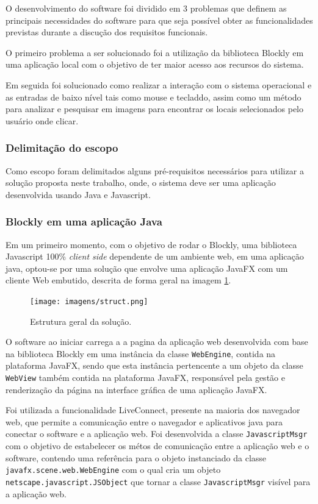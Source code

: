 \documentclass[tg]{mdtufsm}
\begin{document}
    O desenvolvimento do software foi dividido em 3 problemas que definem as principais necessidades do software para que seja possível obter as funcionalidades previstas durante a discução dos requisitos funcionais.

    O primeiro problema a ser solucionado foi a utilização da biblioteca Blockly em uma aplicação local com o objetivo de ter maior acesso aos recursos do sistema.

    Em seguida foi solucionado como realizar a interação com o sistema operacional e as entradas de baixo nível tais como mouse e tecladdo, assim como um método para analizar e pesquisar em imagens para encontrar os locais selecionados pelo usuário onde clicar.

    \subsubsection {Delimitação do escopo}

    Como escopo foram delimitados alguns pré-requisitos necessários para utilizar a solução proposta neste trabalho, onde, o sistema deve ser uma aplicação desenvolvida usando Java e Javascript.

    \subsubsection {Blockly em uma aplicação Java}

    Em um primeiro momento, com o objetivo de rodar o Blockly, uma biblioteca Javascript 100\% \emph{client side} dependente de um ambiente web, em uma aplicação java, optou-se por uma solução que envolve uma aplicação JavaFX com um cliente Web embutido, descrita de forma geral na imagem \ref{fig:struct}.

    \begin{figure}[!htb]
        {\centering
        \texttt{[image: imagens/struct.png]}
        \caption{Estrutura geral da solução.}
        \label{fig:struct}}
    \end{figure}

    O software ao iniciar carrega a a pagina da aplicação web desenvolvida com base na biblioteca Blockly em uma instância da classe \texttt{WebEngine}, contida na plataforma JavaFX, sendo que esta instância pertencente a um objeto da classe \texttt{WebView} também contida na plataforma JavaFX, responsável pela gestão e renderização da página na interface gráfica de uma aplicação JavaFX.

    Foi utilizada a funcionalidade LiveConnect, presente na maioria dos navegador web, que permite a comunicação entre o navegador e aplicativos java para conectar o software e a aplicação web. Foi desenvolvida a classe \texttt{JavascriptMsgr} com o objetivo de estabelecer os métos de comunicação entre a aplicação web e o software, contendo uma referência para o objeto instanciado da classe \texttt{javafx.scene.web.WebEngine} com o qual cria um objeto \texttt{netscape.javascript.JSObject} que tornar a classe \texttt{JavascriptMsgr} visível para a aplicação web.
\end{document}
